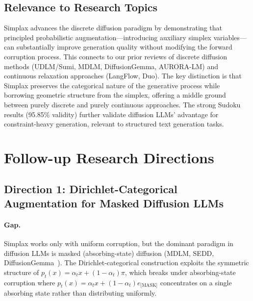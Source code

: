 \documentclass[11pt,a4paper]{article}
\begin{document}
\subsection{Relevance to Research Topics}

Simplax advances the discrete diffusion paradigm by demonstrating that principled probabilistic augmentation---introducing auxiliary simplex variables---can substantially improve generation quality without modifying the forward corruption process. This connects to our prior reviews of discrete diffusion methods (UDLM/Sumi, MDLM, DiffusionGemma, AURORA-LM) and continuous relaxation approaches (LangFlow, Duo). The key distinction is that Simplax preserves the categorical nature of the generative process while borrowing geometric structure from the simplex, offering a middle ground between purely discrete and purely continuous approaches. The strong Sudoku results (95.85\% validity) further validate diffusion LLMs' advantage for constraint-heavy generation, relevant to structured text generation tasks.

\section{Follow-up Research Directions}

\subsection{Direction 1: Dirichlet-Categorical Augmentation for Masked Diffusion LLMs}

\paragraph{Gap.} Simplax works only with uniform corruption, but the dominant paradigm in diffusion LLMs is masked (absorbing-state) diffusion (MDLM, SEDD, DiffusionGemma~\cite{diffgemma2026}). The Dirichlet-categorical construction exploits the symmetric structure of $p_t(x) = \alpha_t x + (1-\alpha_t)\pi$, which breaks under absorbing-state corruption where $p_t(x) = \alpha_t x + (1-\alpha_t) e_{\text{[MASK]}}$ concentrates on a single absorbing state rather than distributing uniformly.
\end{document}
